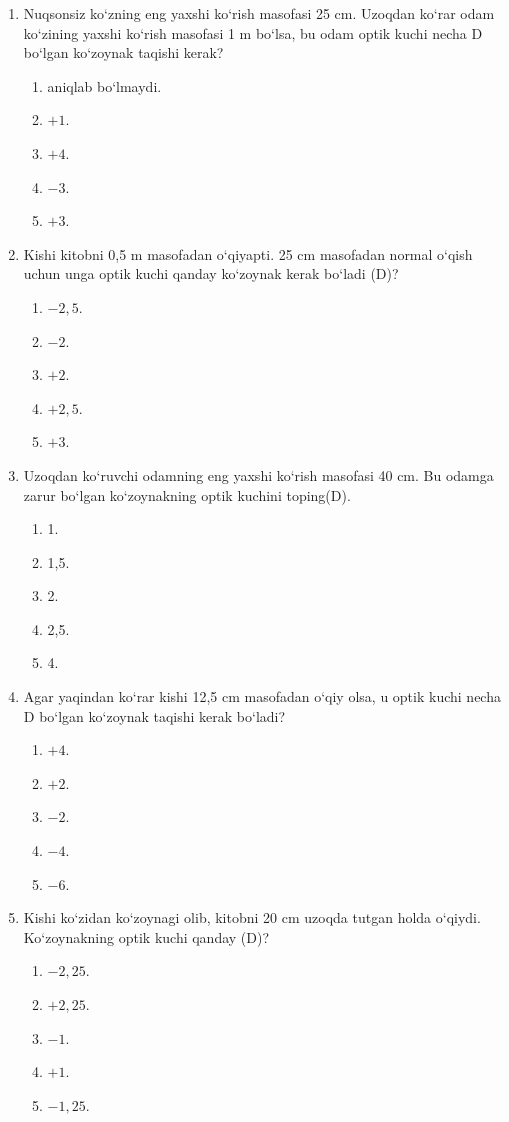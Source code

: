 \begin{enumerate}
\item Nuqsonsiz ko‘zning eng yaxshi ko‘rish masofasi 25 cm. Uzoqdan ko‘rar odam ko‘zining yaxshi ko‘rish masofasi 1 m bo‘lsa, bu odam optik kuchi necha D bo‘lgan ko‘zoynak taqishi kerak?
\begin{enumerate}[label=\Alph*)]
\item aniqlab bo‘lmaydi.
\item $+1$.
\item $+4$.
\item $-3$.
\item $+3$.
\end{enumerate}

\item Kishi kitobni 0,5 m masofadan o‘qiyapti. 25 cm masofadan normal o‘qish uchun unga optik kuchi qanday ko‘zoynak kerak bo‘ladi (D)?
\begin{enumerate}[label=\Alph*)]
\item $-2,5$.
\item $-2$.
\item $+2$.
\item $+2,5$.
\item $+3$.
\end{enumerate}

\item Uzoqdan ko‘ruvchi odamning eng yaxshi ko‘rish masofasi 40 cm. Bu odamga zarur bo‘lgan ko‘zoynakning optik kuchini toping(D).
\begin{enumerate}[label=\Alph*)]
\item 1.
\item 1,5.
\item 2.
\item 2,5.
\item 4.
\end{enumerate}

\item Agar yaqindan ko‘rar kishi 12,5 cm masofadan o‘qiy olsa, u optik kuchi necha D bo‘lgan ko‘zoynak taqishi kerak bo‘ladi?
\begin{enumerate}[label=\Alph*)]
\item $+4$.
\item $+2$.
\item $-2$.
\item $-4$.
\item $-6$.
\end{enumerate}

\item Kishi ko‘zidan ko‘zoynagi olib, kitobni 20 cm uzoqda tutgan holda o‘qiydi. Ko‘zoynakning optik kuchi qanday (D)?
\begin{enumerate}[label=\Alph*)]
\item $-2,25$.
\item $+2,25$.
\item $-1$.
\item $+1$.
\item $-1,25$.
\end{enumerate}


\end{enumerate}
